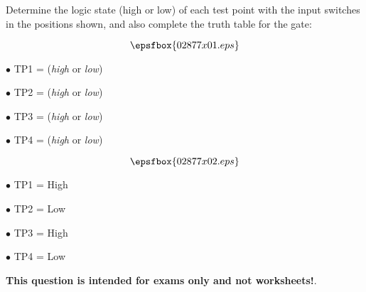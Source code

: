 

Determine the logic state (high or low) of each test point with the input switches in the positions shown, and also complete the truth table for the gate:

$$\epsfbox{02877x01.eps}$$

\medskip
\item{$\bullet$} TP1 = ({\it high} or {\it low}) 
\item{$\bullet$} TP2 = ({\it high} or {\it low}) 
\item{$\bullet$} TP3 = ({\it high} or {\it low}) 
\item{$\bullet$} TP4 = ({\it high} or {\it low}) 
\medskip







$$\epsfbox{02877x02.eps}$$

\medskip
\item{$\bullet$} TP1 = High
\item{$\bullet$} TP2 = Low
\item{$\bullet$} TP3 = High
\item{$\bullet$} TP4 = Low
\medskip







{\bf This question is intended for exams only and not worksheets!}.




